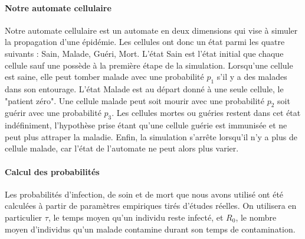 \documentclass{article}
\begin{document}
\paragraph{Notre automate cellulaire\\[0.2cm]}
	Notre automate cellulaire est un automate en deux dimensions qui vise à simuler la propagation d'une épidémie. Les cellules ont donc un état parmi les quatre suivants : Sain, Malade, Guéri, Mort. L'état Sain est l'état initial que chaque cellule sauf une possède à la première étape de la simulation. Lorsqu'une cellule est saine, elle peut tomber malade avec une probabilité $p_1$ s'il y a des malades dans son entourage. L'état Malade est au départ donné à une seule cellule, le "patient zéro". Une cellule malade peut soit mourir avec une probabilité $p_2$ soit guérir avec une probabilité $p_3$. Les cellules mortes ou guéries restent dans cet état indéfiniment, l'hypothèse prise étant qu'une cellule guérie est immunisée et ne peut plus attraper la maladie. Enfin, la simulation s'arrête lorsqu'il n'y a plus de cellule malade, car l'état de l'automate ne peut alors plus varier.
	
\paragraph{Calcul des probabilités\\[0.2cm]}
	Les probabilités d'infection, de soin et de mort que nous avons utilisé ont été calculées à partir de paramètres empiriques tirés d'études réelles. On utilisera en particulier $\tau$, le temps moyen qu'un individu reste infecté, et $R_0$, le nombre moyen d'individus qu'un malade contamine durant son temps de contamination.
	
\end{document}
